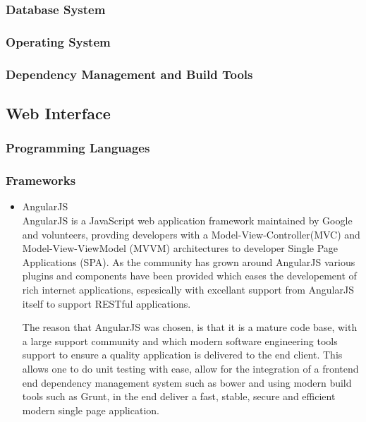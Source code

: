 \documentclass[a4paper,10pt]{article}
\begin{document}
\subsubsection{Database System}
\subsubsection{Operating System}
\subsubsection{Dependency Management and Build Tools}

\subsection{Web Interface}
\subsubsection{Programming Languages}
\subsubsection{Frameworks}
	\begin{itemize}
	\item AngularJS\\
		AngularJS is a JavaScript web application framework maintained by Google and volunteers, provding developers with a Model-View-Controller(MVC) and Model-View-ViewModel (MVVM) architectures to developer Single Page Applications (SPA). As the community has grown around AngularJS various plugins and components have been provided which eases the developement of rich internet applications, espesically with excellant support from AngularJS itself to support RESTful applications.

		The reason that AngularJS was chosen, is that it is a mature code base, with a large support community and which modern software engineering tools support to ensure a quality application is delivered to the end client. This allows one to do unit testing with ease, allow for the integration of a frontend end dependency management system such as bower and using modern build tools such as Grunt, in the end deliver a fast, stable, secure and efficient modern single page application.
	\end{itemize}
\end{document}
